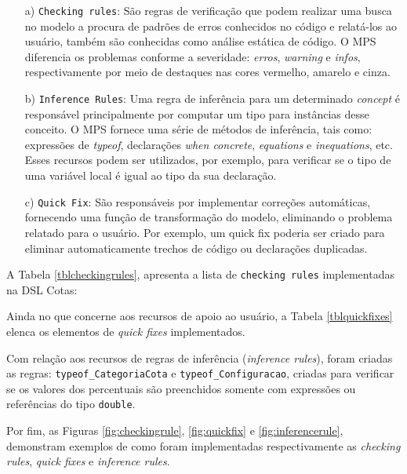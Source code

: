 \begin{enumerate}
 
 \item[a)] \texttt{Checking rules}: São regras de verificação que podem realizar uma busca no modelo a procura de padrões de erros conhecidos no código e relatá-los ao usuário, também são conhecidas como análise estática de código. O \gls{MPS} diferencia os problemas conforme a severidade: \textit{erros}, \textit{warning} e \textit{infos}, respectivamente por meio de destaques nas cores vermelho, amarelo e cinza.
 
 \item[b)]\texttt{Inference Rules}: Uma regra de inferência para um determinado \textit{concept} é responsável principalmente por computar um tipo para instâncias desse conceito. O \gls{MPS} fornece uma série de métodos de inferência, tais como: expressões de \textit{typeof}, declarações \textit{when concrete}, \textit{equations} e \textit{inequations}, etc. Esses recursos podem ser utilizados, por exemplo, para verificar se o tipo de uma variável local é igual ao tipo da sua declaração.
 
 \item[c)]\texttt{Quick Fix}: São responsáveis por implementar correções automáticas, fornecendo uma função de transformação do modelo, eliminando o problema relatado para o usuário. Por exemplo, um quick fix poderia ser criado para eliminar automaticamente trechos de código ou declarações duplicadas.
\end{enumerate}


A Tabela \ref{tblcheckingrules}, apresenta a lista de \texttt{checking rules} implementadas na DSL Cotas:



Ainda no que concerne aos recursos de apoio ao usuário, a Tabela \ref{tblquickfixes} elenca os elementos de \textit{quick fixes} implementados.



Com relação aos recursos de regras de inferência (\textit{inference rules}), foram criadas as regras: \texttt{typeof\_CategoriaCota} e \texttt{typeof\_Configuracao}, criadas para verificar se os valores dos percentuais são preenchidos somente com expressões ou referências do tipo \texttt{double}.

Por fim, as Figuras \ref{fig:checkingrule}, \ref{fig:quickfix} e \ref{fig:inferencerule}, demonstram exemplos de como foram implementadas respectivamente as \textit{checking rules}, \textit{quick fixes} e \textit{inference rules}. 
